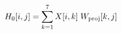\documentclass[preview]{standalone}
\begin{document}
\begin{align*}
\special{dvisvgm:raw <g id='unique000'>}H_0[i,j] = \sum_{k=1}^{7} X[i,k]\; W_{\mathrm{proj}}[k,j]\special{dvisvgm:raw </g>}
\end{align*}
\end{document}
